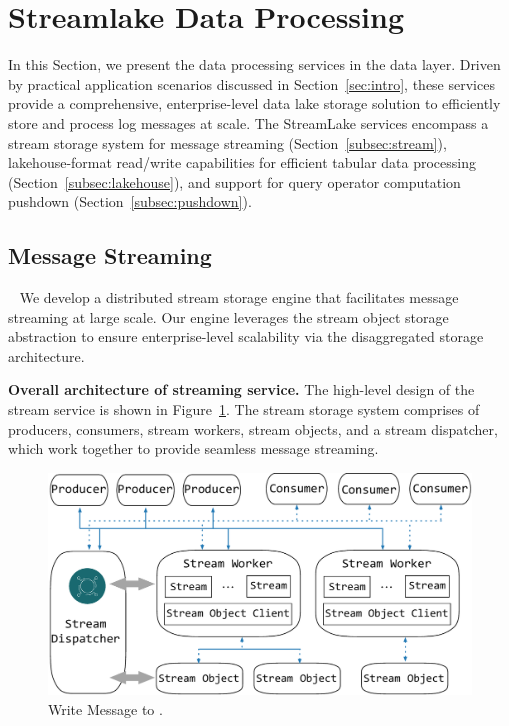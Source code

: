\section{Streamlake Data Processing} 
\label{sec:dataeva}

In this Section, we present the data processing services  in the data layer. Driven by practical application scenarios discussed in Section~\ref{sec:intro}, these services provide a comprehensive, enterprise-level data lake storage solution  to efficiently store and process  log messages at scale. The StreamLake services encompass a stream storage system for message streaming (Section~\ref{subsec:stream}), lakehouse-format read/write capabilities for efficient tabular data processing (Section~\ref{subsec:lakehouse}),  and support for query operator computation pushdown (Section~\ref{subsec:pushdown}).


\subsection{Message Streaming}~\label{subsec:stream}
We develop a  distributed stream storage engine that facilitates message streaming at large scale. Our engine leverages the stream object storage abstraction to ensure enterprise-level scalability via the disaggregated storage architecture.


\noindent\textbf{Overall architecture of streaming service.} The high-level design of the stream service is shown in Figure~\ref{fig:service}. The stream storage system comprises of producers, consumers, stream workers, stream objects, and a stream dispatcher, which work together to provide seamless message streaming.



\begin{figure}[htbp]
	
	\includegraphics[scale=0.36]{figures/streamservice}
	\centering
	\vspace{-1em}
	\caption{Write Message to \sys.}
	\label{fig:service}
	\vspace{-1em}
\end{figure}

